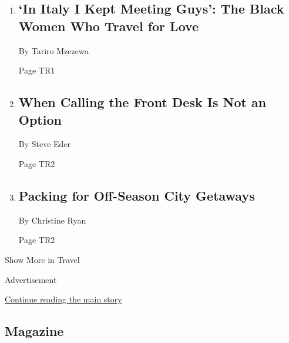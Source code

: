 \begin{enumerate}
\def\labelenumi{\arabic{enumi}.}
\item
  \href{/2020/02/14/travel/italy-black-women-love.html}{}

  \hypertarget{in-italy-i-kept-meeting-guys-the-black-women-who-travel-for-love-1}{%
  \subsection{`In Italy I Kept Meeting Guys': The Black Women Who Travel
  for
  Love}\label{in-italy-i-kept-meeting-guys-the-black-women-who-travel-for-love-1}}

  By Tariro Mzezewa

  Page TR1
\item
  \href{/2020/02/12/travel/airbnb-safety.html}{}

  \hypertarget{when-calling-the-front-desk-is-not-an-option}{%
  \subsection{When Calling the Front Desk Is Not an
  Option}\label{when-calling-the-front-desk-is-not-an-option}}

  By Steve Eder

  Page TR2
\item
  \href{/2020/02/15/travel/packing-for-off-season-city-getaways.html}{}

  \hypertarget{packing-for-off-season-city-getaways}{%
  \subsection{Packing for Off-Season City
  Getaways}\label{packing-for-off-season-city-getaways}}

  By Christine Ryan

  Page TR2
\end{enumerate}

Show More in Travel

Advertisement

\protect\hyperlink{after-mid5}{Continue reading the main story}

\hypertarget{magazine}{%
\subsection{Magazine}\label{magazine}}

